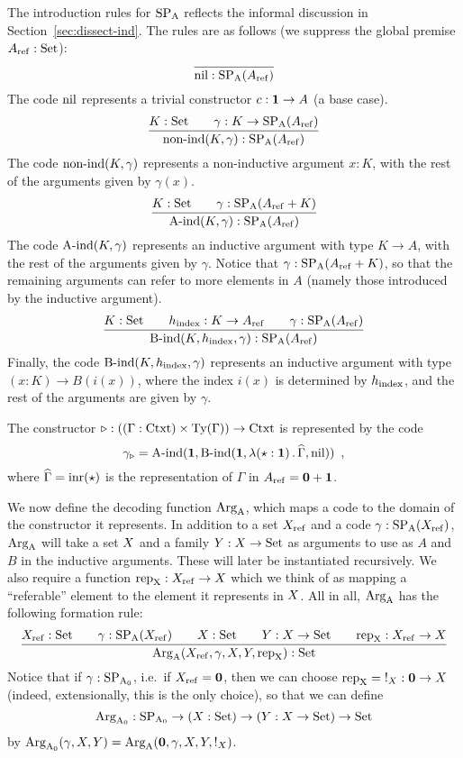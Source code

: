 \documentclass{article}
\begin{document}
The introduction rules for $\text{SP}_{\mathrm{A}}$ reflects the informal discussion in
Section~\ref{sec:dissect-ind}. The rules are as follows (we suppress
the global premise $A_{\mathrm{ref}} : \text{Set}$):
\[
\infer{\nilA : \SPA(\Aref)}{}
\]
%
The code $\text{nil}$ represents a trivial constructor $c : \mathbf{1} \to A$ (a base case).
%
\[
\infer{\nonindA(K, \gamma) : \SPA(\Aref)}{K : \Set & \quad \gamma : K \to \SPA(\Aref)}
\]
%
The code $\text{non-ind}(K, \gamma)$ represents a non-inductive argument $x
: K$, with the rest of the arguments given by $\gamma(x)$.
%
\[
\infer{\AindA(K, \gamma) : \SPA(\Aref)}{K : \Set & \quad \gamma : \SPA(\Aref + K)}
\]
%
The code $\text{A-ind}(K, \gamma)$ represents an inductive argument with
type $K \to A$, with the rest of the arguments given by
$\gamma$. Notice that $\gamma : \text{SP}_{\mathrm{A}}(A_{\mathrm{ref}} + K)$, so that the
remaining arguments can refer to more elements in $A$ (namely those
introduced by the inductive argument).
%
\[
\infer{\BindA(K, \hindex, \gamma) : \SPA(\Aref)}{K : \Set & \quad \hindex : K \to \Aref & \quad \gamma : \SPA(\Aref)}
\]
%
Finally, the code $\text{B-ind}(K, h_{\mathrm{index}}, \gamma)$ represents an inductive
argument with type $(x : K) \to B(i(x))$, where the index $i(x)$ is
determined by $h_{\mathrm{index}}$, and the rest of the arguments are given by
$\gamma$.
%

\begin{example}
  The constructor $\triangleright : ((\Gamma : \text{Ctxt}) \times \text{Ty}(\Gamma))
  \to \text{Ctxt}$ is represented by the code
\[
\gamma_{\triangleright} = \text{A-ind}(\mathbf{1}, \text{B-ind}(\mathbf{1}, \lambda (\star : \mathbf{1})\,.\,\widehat{\Gamma}, \text{nil})) \enspace ,
\]
where $\widehat{\Gamma} = \text{inr}(\star)$ is the representation of $\Gamma$ in $A_{\mathrm{ref}} = \mathbf{0} + \mathbf{1}$.
\blackqed
\end{example}

We now define the decoding function $\text{Arg}_{\mathrm{A}}$, which maps a code to the
domain of the constructor it represents. In addition to a set $X_{\mathrm{ref}}$
and a code $\gamma : \text{SP}_{\mathrm{A}}(X_{\mathrm{ref}})$, $\text{Arg}_{\mathrm{A}}$ will take a set $X$ and a
family $Y : X \to \text{Set}$ as arguments to use as $A$ and $B$ in the
inductive arguments. These will later be instantiated recursively. We
also require a function $\text{rep}_{\mathrm{X}} : X_{\mathrm{ref}} \to X$ which we think of as
mapping a ``referable'' element to the element it represents in
$X$. All in all, $\text{Arg}_{\mathrm{A}}$ has the following formation rule:
%
\[
\infer{\ArgA(\Xref, \gamma, \A, \B, \repA) : \Set}{\Xref : \Set
                                         & \quad \gamma : \SPA(\Xref)
                                         & \quad \A : \Set
                                         & \quad \B : \A \to \Set
                                         & \quad \repA : \Xref \to \A}
\]
%
Notice that if $\gamma : \text{SP}_{\mathrm{A}_0}$, i.e.\ if $X_{\mathrm{ref}} = \mathbf{0}$, then we can
choose $\text{rep}_{\mathrm{X}} = {} !_{X} : \mathbf{0} \to X$ (indeed, extensionally,
this is the only choice), so that we can define
\[
\text{Arg}_{\mathrm{A}_0} : \text{SP}_{\mathrm{A}_0} \to (X : \text{Set}) \to (Y : X \to \text{Set}) \to \text{Set}
\]
by $\text{Arg}_{\mathrm{A}_0}(\gamma, X, Y) = \text{Arg}_{\mathrm{A}}(\mathbf{0}, \gamma, X, Y, !_{X})$.
\end{document}
